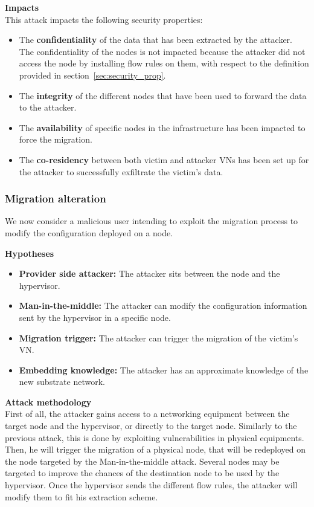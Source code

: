 \textbf{Impacts}\textbf{\\}
This attack impacts the following security properties:
\begin{itemize}
    \item The \textbf{confidentiality} of the data that has been extracted by the attacker.
The confidentiality of the nodes is not impacted because the attacker did not access the node by installing flow rules on them, with respect to the definition provided in section~\ref{sec:security_prop}.

    \item The \textbf{integrity} of the different nodes that have been used to forward the data to the attacker.
    
    \item The \textbf{availability} of specific nodes in the infrastructure has been impacted to force the migration.
    
    \item The \textbf{co-residency} between both victim and attacker VNs has been set up for the attacker to successfully exfiltrate the victim's data.
\end{itemize}

\newpage
\subsubsection{Migration alteration}
We now consider a malicious user intending to exploit the migration process to modify the configuration deployed on a node.

\textbf{Hypotheses}
\begin{itemize}
    \item \textbf{Provider side attacker:} The attacker sits between the node and the hypervisor.
    \item \textbf{Man-in-the-middle:} The attacker can modify the configuration information sent by the hypervisor in a specific node.
    \item \textbf{Migration trigger:} The attacker can trigger the migration of the victim's VN.
    \item \textbf{Embedding knowledge:} The attacker has an approximate knowledge of the new substrate network.
\end{itemize}

\textbf{Attack methodology}\textbf{\\}
First of all, the attacker gains access to a networking equipment between the target node and the hypervisor, or directly to the target node. Similarly to the previous attack, this is done by exploiting vulnerabilities in physical equipments.
Then, he will trigger the migration of a physical node, that will be redeployed on the node targeted by the Man-in-the-middle attack. Several nodes may be targeted to improve the chances of the destination node to be used by the hypervisor.
Once the hypervisor sends the different flow rules, the attacker will modify them to fit his extraction scheme.


